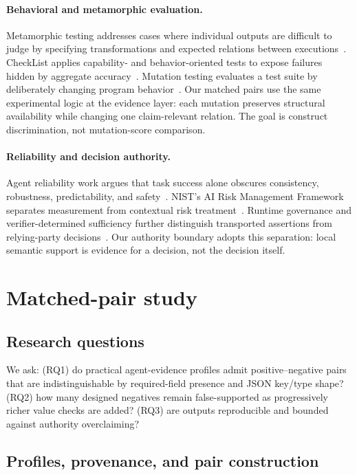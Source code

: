 \documentclass[preprint,12pt]{elsarticle}
\begin{document}
\paragraph{Behavioral and metamorphic evaluation.}
Metamorphic testing addresses cases where individual outputs are difficult to judge by specifying transformations and expected relations between executions~\cite{segura2016metamorphic}. CheckList applies capability- and behavior-oriented tests to expose failures hidden by aggregate accuracy~\cite{ribeiro2020checklist}. Mutation testing evaluates a test suite by deliberately changing program behavior~\cite{jia2011mutation}. Our matched pairs use the same experimental logic at the evidence layer: each mutation preserves structural availability while changing one claim-relevant relation. The goal is construct discrimination, not mutation-score comparison.

\paragraph{Reliability and decision authority.}
Agent reliability work argues that task success alone obscures consistency, robustness, predictability, and safety~\cite{rabanser2026reliability}. NIST's AI Risk Management Framework separates measurement from contextual risk treatment~\cite{nist2023airmf}. Runtime governance and verifier-determined sufficiency further distinguish transported assertions from relying-party decisions~\cite{kaul2026agentbound,macguire2026xchk}. Our authority boundary adopts this separation: local semantic support is evidence for a decision, not the decision itself.

\section{Matched-pair study}

\subsection{Research questions}

We ask: (RQ1) do practical agent-evidence profiles admit positive--negative pairs that are indistinguishable by required-field presence and JSON key/type shape? (RQ2) how many designed negatives remain false-supported as progressively richer value checks are added? (RQ3) are outputs reproducible and bounded against authority overclaiming?

\subsection{Profiles, provenance, and pair construction}
\end{document}
